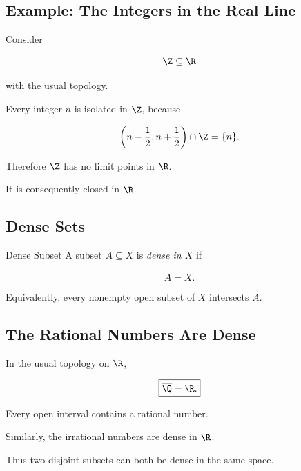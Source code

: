 \subsection{Example: The Integers in the Real Line}
\label{subsec:integers-isolated}

Consider

\[
\Z\subseteq\R
\]

with the usual topology.

Every integer \(n\) is isolated in \(\Z\), because

\[
\left(
n-\frac12,
n+\frac12
\right)
\cap\Z
=
\{n\}.
\]

Therefore \(\Z\) has no limit points in \(\R\).

It is consequently closed in \(\R\).

\subsection{Dense Sets}
\label{subsec:dense-sets}

\begin{definitionbox}{Dense Subset}
A subset \(A\subseteq X\) is \emph{dense in \(X\)} if

\[
\boxed{
\overline{A}=X.
}
\]
\end{definitionbox}

Equivalently, every nonempty open subset of \(X\) intersects \(A\).

\subsection{The Rational Numbers Are Dense}
\label{subsec:rationals-dense}

In the usual topology on \(\R\),

\[
\boxed{
\overline{\Q}=\R.
}
\]

Every open interval contains a rational number.

Similarly, the irrational numbers are dense in \(\R\).

Thus two disjoint subsets can both be dense in the same space.

